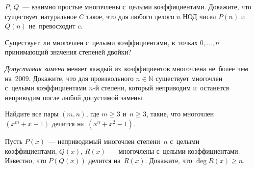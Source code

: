 \begin{problems}
\item
$P$, $Q$~--- взаимно простые многочлены с~целыми коэффициентами.
Докажите, что существует натуральное $C$ такое, что для любого
целого $n$ НОД чисел $P(n)$ и~$Q(n)$ не~превосходит $c$.
    
\item
Существует~ли многочлен с~целыми коэффициентами, в~точках $0, \ldots, n$
принимающий значения степеней двойки?

\item
\emph{Допустимая замена} меняет каждый из~коэффициентов многочлена не~более чем
на~2009.
Докажите, что для произвольного $n \in \mathbb{N}$ существует многочлен
с~целыми коэффициентами $n$-й степени, который неприводим и~останется
неприводим после любой допустимой замены.

\item
Найдите все пары $(m, n)$, где $m \geq 3$ и~$n \geq 3$, такие, что
многочлен $(x^m + x - 1)$ делится на~$(x^n + x^2 - 1)$.
    
\item
Пусть $P(x)$~--- неприводимый многочлен степени~$n$ с~целыми коэффициентами,
$Q(x)$, $R(x)$~--- многочлены с~целыми коэффициентами.
Известно, что $P(Q(x))$ делится на~$R(x)$.
Докажите, что $\deg R(x) \geq n$.

\end{problems}

